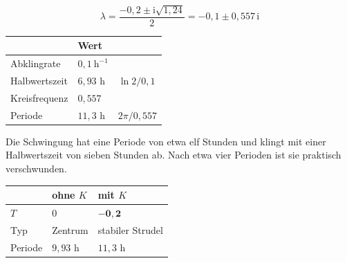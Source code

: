 \begin{aufgabe}
\[ \lambda = \frac{-0{,}2 \pm \mathrm{i}\sqrt{1{,}24}}{2} = -0{,}1 \pm 0{,}557\,\mathrm{i} \]

\begin{center}
\renewcommand{\arraystretch}{1.48}
\begin{tabular}{@{}P{2.8cm}P{2.4cm}P{2.4cm}@{}}
\toprule
& \textbf{Wert} & \\
\midrule
Abklingrate & $0{,}1\ \mathrm{h}^{-1}$ & \\
Halbwertszeit & $6{,}93$ h & $\ln2/0{,}1$\\
Kreisfrequenz & $0{,}557$ & \\
Periode & $11{,}3$ h & $2\pi/0{,}557$\\
\bottomrule
\end{tabular}
\end{center}

Die Schwingung hat eine Periode von etwa elf Stunden und klingt mit einer Halbwertszeit von sieben Stunden ab. Nach etwa vier Perioden ist sie praktisch verschwunden.

\begin{center}
\renewcommand{\arraystretch}{1.48}
\begin{tabular}{@{}P{2.8cm}P{2.4cm}P{2.4cm}@{}}
\toprule
& \textbf{ohne $K$} & \textbf{mit $K$}\\
\midrule
$T$ & $0$ & $\mathbf{-0{,}2}$\\
Typ & Zentrum & \textcolor{gruen}{stabiler Strudel}\\
Periode & $9{,}93$ h & $11{,}3$ h\\
\bottomrule
\end{tabular}
\end{center}

\begin{center}
\begin{minipage}{0.88\textwidth}
\end{minipage}
\end{center}
\end{aufgabe}

